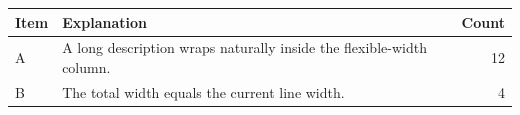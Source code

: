 \documentclass[11pt]{article}
\begin{document}
\noindent\begin{tabularx}{\linewidth}{@{}lXr@{}}\toprule
Item & Explanation & Count\\\midrule
A & A long description wraps naturally inside the flexible-width column. & 12\\
B & The total width equals the current line width. & 4\\\bottomrule\end{tabularx}
\end{document}
